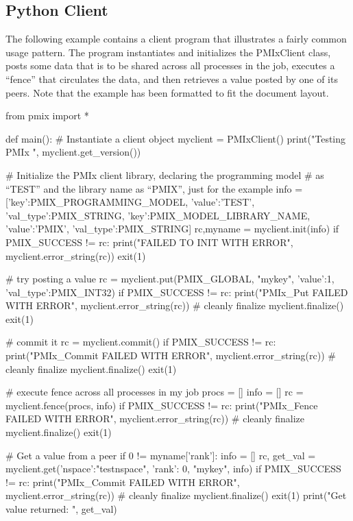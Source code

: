 \subsection{Python Client}

The following example contains a client program that illustrates a fairly common usage pattern. The program instantiates and initializes the PMIxClient class, posts some data that is to be shared across all processes in the job, executes a “fence” that circulates the data, and then retrieves a value posted by one of its peers. Note that the example has been formatted to fit the document layout.


\pyspecificstart
\begin{codepar}
from pmix import *

def main():
    # Instantiate a client object
    myclient = PMIxClient()
    print("Testing PMIx ", myclient.get_version())

    # Initialize the PMIx client library, declaring the programming model
    # as “TEST” and the library name as “PMIX”, just for the example
    info = [{'key':PMIX_PROGRAMMING_MODEL,
             'value':'TEST', 'val_type':PMIX_STRING},
            {'key':PMIX_MODEL_LIBRARY_NAME,
             'value':'PMIX', 'val_type':PMIX_STRING}]
    rc,myname = myclient.init(info)
    if PMIX_SUCCESS != rc:
        print("FAILED TO INIT WITH ERROR", myclient.error_string(rc))
        exit(1)

    # try posting a value
    rc = myclient.put(PMIX_GLOBAL, "mykey",
                      {'value':1, 'val_type':PMIX_INT32})
    if PMIX_SUCCESS != rc:
        print("PMIx_Put FAILED WITH ERROR", myclient.error_string(rc))
        # cleanly finalize
        myclient.finalize()
        exit(1)

    # commit it
    rc = myclient.commit()
    if PMIX_SUCCESS != rc:
        print("PMIx_Commit FAILED WITH ERROR",
              myclient.error_string(rc))
        # cleanly finalize
        myclient.finalize()
        exit(1)

    # execute fence across all processes in my job
    procs = []
    info = []
    rc = myclient.fence(procs, info)
    if PMIX_SUCCESS != rc:
        print("PMIx_Fence FAILED WITH ERROR", myclient.error_string(rc))
        # cleanly finalize
        myclient.finalize()
        exit(1)

    # Get a value from a peer
    if 0 != myname['rank']:
        info = []
        rc, get_val = myclient.get({'nspace':"testnspace", 'rank': 0},
                                   "mykey", info)
        if PMIX_SUCCESS != rc:
            print("PMIx_Commit FAILED WITH ERROR",
                  myclient.error_string(rc))
            # cleanly finalize
            myclient.finalize()
            exit(1)
        print("Get value returned: ", get_val)


\end{codepar}

